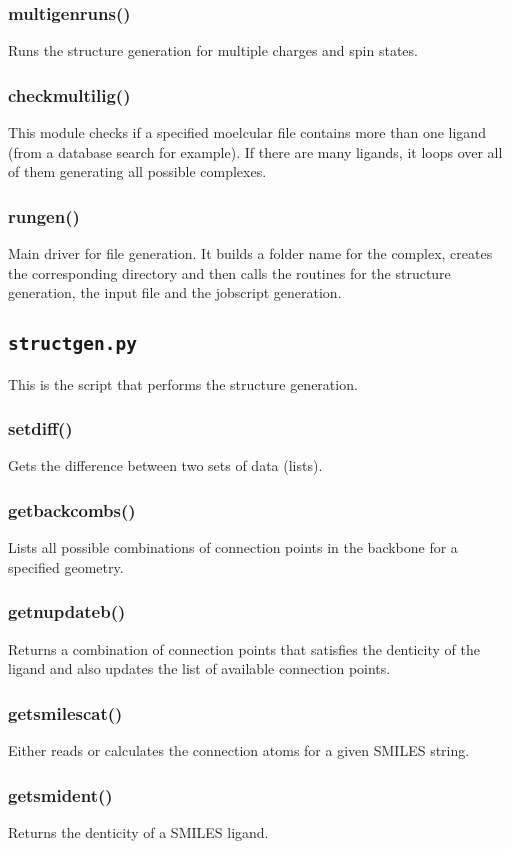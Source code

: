 \documentclass[a4paper,12pt]{assignment}
\begin{document}
\subsubsection{multigenruns()}
Runs the structure generation for multiple charges and spin states.
\subsubsection{checkmultilig()}
This module checks if a specified moelcular file contains more than one ligand (from a database search for example). If there are many ligands, it loops over all of them generating all possible complexes.
\subsubsection{rungen()}
Main driver for file generation. It builds a folder name for the complex, creates the corresponding directory and then calls the routines for the structure generation, the input file and the jobscript generation.

\subsection{\texttt{structgen.py}}
This is the script that performs the structure generation. 
\subsubsection{setdiff()}
Gets the difference between two sets of data (lists).
\subsubsection{getbackcombs()}
Lists all possible combinations of connection points in the backbone for a specified geometry.
\subsubsection{getnupdateb()}
Returns a combination of connection points that satisfies the denticity of the ligand and also updates the list of available connection points.
\subsubsection{getsmilescat()}
Either reads or calculates the connection atoms for a given SMILES string.
\subsubsection{getsmident()}
Returns the denticity of a SMILES ligand.
\end{document}
